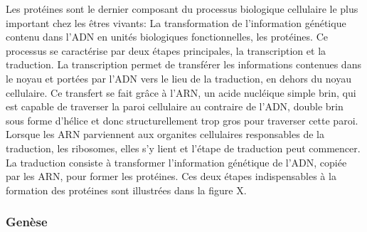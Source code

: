 Les protéines sont le dernier composant du processus biologique cellulaire le plus important chez les êtres vivants: La transformation de l'information génétique contenu dans l'ADN en unités biologiques fonctionnelles, les protéines. Ce processus se caractérise par deux étapes principales, la transcription et la traduction. La transcription permet de transférer les informations contenues dans le noyau et portées par l'ADN vers le lieu de la traduction, en dehors du noyau cellulaire. Ce transfert se fait grâce à l'ARN, un acide nucléique simple brin, qui est capable de traverser la paroi cellulaire au contraire de l'ADN, double brin sous forme d'hélice et donc structurellement trop gros pour traverser cette paroi. Lorsque les ARN parviennent aux organites cellulaires responsables de la traduction, les ribosomes, elles s'y lient et l'étape de traduction peut commencer. La traduction consiste à transformer l'information génétique de l'ADN, copiée par les ARN, pour former les protéines. Ces deux étapes indispensables à la formation des protéines sont illustrées dans la figure X.

\subsubsection{Genèse}

